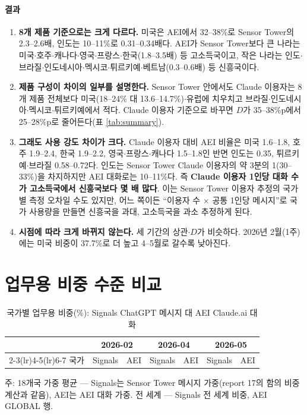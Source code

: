 \documentclass[11pt]{article}
\begin{document}
\paragraph{결과}
\begin{enumerate}[leftmargin=*]
  \item \textbf{8개 제품 기준으로는 크게 다르다.} 미국은 AEI에서 32--38\%로 Sensor Tower의 2.3--2.6배, 인도는 10--11\%로 0.31--0.34배다. AEI가 Sensor Tower보다 큰 나라는 미국$\cdot$호주$\cdot$캐나다$\cdot$영국$\cdot$프랑스$\cdot$한국(1.8--3.5배) 등 고소득국이고, 작은 나라는 인도$\cdot$브라질$\cdot$인도네시아$\cdot$멕시코$\cdot$튀르키예$\cdot$베트남(0.3--0.6배) 등 신흥국이다.
  \item \textbf{제품 구성이 차이의 일부를 설명한다.} Sensor Tower 안에서도 Claude 이용자는 8개 제품 전체보다 미국(18--24\% 대 13.6--14.7\%)$\cdot$유럽에 치우치고 브라질$\cdot$인도네시아$\cdot$멕시코$\cdot$튀르키예에서 적다. Claude 이용자 기준으로 바꾸면 $D$가 35--38\%p에서 25--28\%p로 줄어든다(표 \ref{tab:summary}).
  \item \textbf{그래도 사용 강도 차이가 크다.} Claude 이용자 대비 AEI 비율은 미국 1.6--1.8, 호주 1.9--2.4, 한국 1.9--2.2, 영국$\cdot$프랑스$\cdot$캐나다 1.5--1.8인 반면 인도는 0.35, 튀르키예$\cdot$브라질 0.58--0.72다. 인도는 Sensor Tower Claude 이용자의 약 3분의 1(30--33\%)을 차지하지만 AEI 대화로는 10--11\%다. 즉 \textbf{Claude 이용자 1인당 대화 수가 고소득국에서 신흥국보다 몇 배 많다}. 이는 Sensor Tower 이용자 추정의 국가별 측정 오차일 수도 있지만, 어느 쪽이든 ``이용자 수 $\times$ 공통 1인당 메시지''로 국가 사용량을 만들면 신흥국을 과대, 고소득국을 과소 추정하게 된다.
  \item \textbf{시점에 따라 크게 바뀌지 않는다.} 세 기간의 상관$\cdot$$D$가 비슷하다. 2026년 2월(1주)에는 미국 비중이 37.7\%로 더 높고 4--5월로 갈수록 낮아진다.
\end{enumerate}

\section{업무용 비중 수준 비교}

\begin{table}[htbp]
\centering
\caption{국가별 업무용 비중(\%): Signals ChatGPT 메시지 대 AEI Claude.ai 대화}\label{tab:worklevel}
\begin{tabular}{lrrrrrr}
\toprule
 & \multicolumn{2}{c}{2026-02} & \multicolumn{2}{c}{2026-04} & \multicolumn{2}{c}{2026-05} \\
\cmidrule(lr){2-3}\cmidrule(lr){4-5}\cmidrule(lr){6-7}
국가 & Signals & AEI & Signals & AEI & Signals & AEI \\
\midrule

\bottomrule
\end{tabular}
\par\smallskip\footnotesize 주: 18개국 가중 평균 --- Signals는 Sensor Tower 메시지 가중(report 17의 함의 비중 계산과 같음), AEI는 AEI 대화 가중. 전 세계 --- Signals 전 세계 비중, AEI GLOBAL 행.
\end{table}
\end{document}
